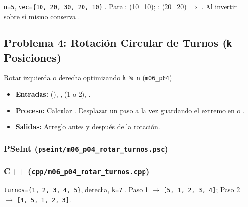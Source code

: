\documentclass[11pt,letterpaper]{article}
\begin{document}
\begin{pruebaescritorio}{\texttt{n=5}, \texttt{vec=\{10, 20, 30, 20, 10\}}}
. Para :  (10=10); :  (20=20) $\Rightarrow$ . Al invertir sobre sí mismo conserva \codigo{[10, 20, 30, 20, 10]}.
\end{pruebaescritorio}

\subsection{Problema 4: Rotación Circular de Turnos (\texttt{k} Posiciones)}
\begin{analisis}{Rotar izquierda o derecha optimizando \texttt{k \% n} (\texttt{m06\_p04})}
\begin{itemize}
  \item \textbf{Entradas:}  (), ,  (1 o 2), .
  \item \textbf{Proceso:} Calcular . Desplazar un paso a la vez guardando el extremo en  o .
  \item \textbf{Salidas:} Arreglo antes y después de la rotación.
\end{itemize}
\end{analisis}

\subsubsection*{PSeInt (\texttt{pseint/m06\_p04\_rotar\_turnos.psc})}


\subsubsection*{C++ (\texttt{cpp/m06\_p04\_rotar\_turnos.cpp})}


\begin{pruebaescritorio}{\texttt{turnos=\{1, 2, 3, 4, 5\}}, derecha, \texttt{k=7}}
. Paso 1 $\rightarrow$ \texttt{[5, 1, 2, 3, 4]}; Paso 2 $\rightarrow$ \texttt{[4, 5, 1, 2, 3]}.
\end{pruebaescritorio}
\end{document}
